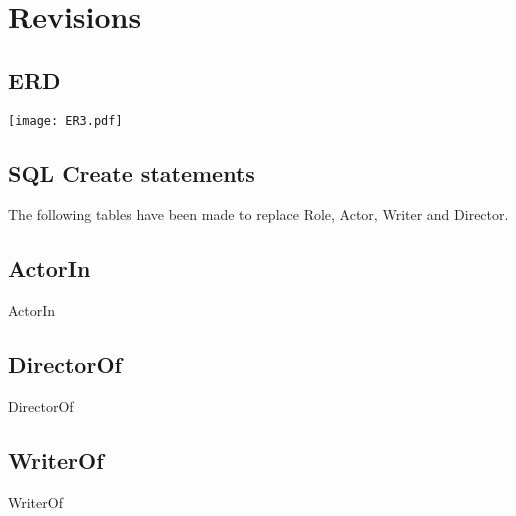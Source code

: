 \section{Revisions}

\subsection{ERD}
\texttt{[image: ER3.pdf]}

\subsection{SQL Create statements}
The following tables have been made to replace Role, Actor, Writer and Director.

\subsection*{ActorIn}
\begin{createSQL}{ActorIn}
\end{createSQL}

\subsection*{DirectorOf}
\begin{createSQL}{DirectorOf}
\end{createSQL}

\subsection*{WriterOf}
\begin{createSQL}{WriterOf}
\end{createSQL}